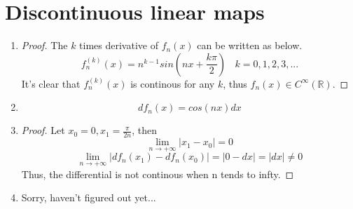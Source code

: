 \documentclass[paper=a4, fontsize=11pt]{scrartcl} %
\numberwithin{equation}{section} %
\numberwithin{figure}{section} %
\numberwithin{table}{section} %
\begin{document}
\section{Discontinuous linear maps}
\begin{enumerate}
	\item 
		\begin{proof}
			The $k$ times derivative of $f_n(x)$ can be written as below.
			\begin{equation}
				f_n^{(k)}(x) = n^{k-1} sin(nx+ \frac{k\pi}{2}) \ \ \ \ k = 0, 1, 2, 3, ...
			\end{equation}
			It's clear that $f_n^{(k)}(x)$ is continous for any $k$, thus $f_n(x) \in C^\infty(\mathbb{R})$.
		\end{proof}
	\item 
		\begin{equation}
			d f_n(x) = cos(nx) dx
		\end{equation}
	\item
		\begin{proof}
			Let $x_0 = 0, x_1 = \frac{\pi}{2n}$, then
			\begin{equation}
				\lim\limits_{n \rightarrow +\infty} \vert x_1-x_0 \vert = 0
			\end{equation}
			\begin{equation}
				\lim\limits_{n \rightarrow +\infty} \vert df_n(x_1) - df_n(x_0) \vert = \vert 0-dx \vert = |dx| \neq 0
			\end{equation}
			Thus, the differential is not continous when n tends to infty.
		\end{proof}
	\item 
		Sorry, haven't figured out yet...
		
	
\end{enumerate}

\end{document}
